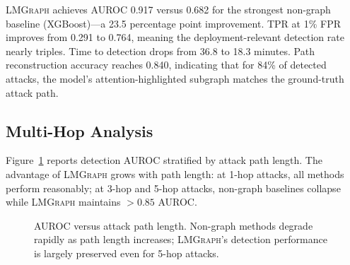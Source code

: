 \documentclass[sigconf,nonacm]{acmart}
\begin{document}
\textsc{LMGraph} achieves AUROC 0.917 versus 0.682 for the strongest non-graph
baseline (XGBoost)---a 23.5 percentage point improvement. TPR at 1\% FPR
improves from 0.291 to 0.764, meaning the deployment-relevant detection rate
nearly triples. Time to detection drops from 36.8 to 18.3 minutes. Path
reconstruction accuracy reaches 0.840, indicating that for 84\% of detected
attacks, the model's attention-highlighted subgraph matches the ground-truth
attack path.

\subsection{Multi-Hop Analysis}

Figure~\ref{fig:multihop_chart} reports detection AUROC stratified by attack
path length. The advantage of \textsc{LMGraph} grows with path length: at
1-hop attacks, all methods perform reasonably; at 3-hop and 5-hop attacks,
non-graph baselines collapse while \textsc{LMGraph} maintains $> 0.85$
AUROC.

\begin{figure}[h]
\centering
{}
\caption{AUROC versus attack path length. Non-graph methods degrade rapidly as
  path length increases; \textsc{LMGraph}'s detection performance is largely
  preserved even for 5-hop attacks.}
\label{fig:multihop_chart}
\end{figure}
\end{document}
